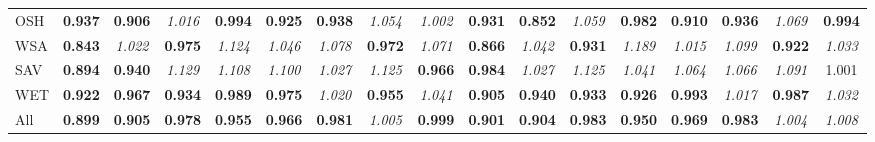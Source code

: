 \begin{table}
\begin{tabular}{l|cccc|cccc|cccc|cccc}
OSH & \textbf{0.937} & \textbf{0.906} & \textit{1.016} & \textbf{0.994} & \textbf{0.925} & \textbf{0.938} & \textit{1.054} & \textit{1.002} & \textbf{0.931} & \textbf{0.852} & \textit{1.059} & \textbf{0.982} & \textbf{0.910} & \textbf{0.936} & \textit{1.069} & \textbf{0.994} \\
WSA & \textbf{0.843} & \textit{1.022} & \textbf{0.975} & \textit{1.124} & \textit{1.046} & \textit{1.078} & \textbf{0.972} & \textit{1.071} & \textbf{0.866} & \textit{1.042} & \textbf{0.931} & \textit{1.189} & \textit{1.015} & \textit{1.099} & \textbf{0.922} & \textit{1.033} \\
SAV & \textbf{0.894} & \textbf{0.940} & \textit{1.129} & \textit{1.108} & \textit{1.100} & \textit{1.027} & \textit{1.125} & \textbf{0.966} & \textbf{0.984} & \textit{1.027} & \textit{1.125} & \textit{1.041} & \textit{1.064} & \textit{1.066} & \textit{1.091} & 1.001 \\
WET & \textbf{0.922} & \textbf{0.967} & \textbf{0.934} & \textbf{0.989} & \textbf{0.975} & \textit{1.020} & \textbf{0.955} & \textit{1.041} & \textbf{0.905} & \textbf{0.940} & \textbf{0.933} & \textbf{0.926} & \textbf{0.993} & \textit{1.017} & \textbf{0.987} & \textit{1.032} \\
\midrule
All & \textbf{0.899} & \textbf{0.905} & \textbf{0.978} & \textbf{0.955} & \textbf{0.966} & \textbf{0.981} & \textit{1.005} & \textbf{0.999} & \textbf{0.901} & \textbf{0.904} & \textbf{0.983} & \textbf{0.950} & \textbf{0.969} & \textbf{0.983} & \textit{1.004} & \textit{1.008} \\
\bottomrule
\end{tabular}
\end{table}